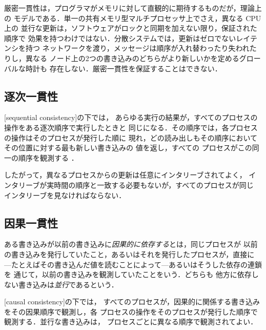 \documentclass[../main.tex]{subfiles}
\begin{document}
厳密一貫性は，プログラマがメモリに対して直観的に期待するものだが，理論上の
モデルである．単一の共有メモリ型マルチプロセッサ上でさえ，異なる CPU 上の
並行な更新は，ソフトウェアがロックと同期を加えない限り，保証された順序で
効果を持つわけではない．分散システムでは，更新はゼロでないレイテンシを持つ
ネットワークを渡り，メッセージは順序が入れ替わったり失われたりし，異なる
ノード上の2つの書き込みのどちらがより新しいかを定めるグローバルな時計も
存在しない．厳密一貫性を保証することはできない．

\subsection{逐次一貫性}

\begin{definition}[逐次一貫性]
  [sequential consistency]の下では，
  あらゆる実行の結果が，すべてのプロセスの操作をある逐次順序で実行したときと
  同じになる．その順序では，各プロセスの操作はそのプロセスが発行した順に
  現れ，どの読み出しもその順序においてその位置に対する最も新しい書き込みの
  値を返し，すべての
  プロセスがこの同一の順序を観測する \cite{lamport1979}．
\end{definition}

したがって，異なるプロセスからの更新は任意にインタリーブされてよく，
インタリーブが実時間の順序と一致する必要もないが，すべてのプロセスが同じ
インタリーブを見なければならない．

\subsection{因果一貫性}

ある書き込みが以前の書き込みに\emph{因果的に依存する}とは，同じプロセスが
以前の書き込みを発行していたこと，あるいはそれを発行したプロセスが，直接に
---たとえばその書き込んだ値を読むことによって---あるいはそうした依存の連鎖を
通じて，以前の書き込みを観測していたことをいう．どちらも
他方に依存しない書き込みは\emph{並行}であるという．

\begin{definition}[因果一貫性]
  [causal consistency]の下では，
  すべてのプロセスが，因果的に関係する書き込みをその因果順序で観測し，各
  プロセスの操作をそのプロセスが発行した順序で観測する．並行な書き込みは，
  プロセスごとに異なる順序で観測されてよい．
\end{definition}
\end{document}

